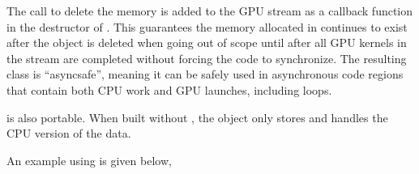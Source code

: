 \documentclass[letterpaper,10pt,english]{sphinxmanual}
\begin{document}
\sphinxAtStartPar
The call to delete the memory is added to the GPU stream as a callback
function in the destructor of . This guarantees the
memory allocated in  continues to exist after the
 object is deleted when going out of scope until
after all GPU kernels in the stream are completed without forcing the
code to synchronize. The resulting  class is
“async\sphinxhyphen{}safe”, meaning it can be safely used in asynchronous code
regions that contain both CPU work and GPU launches, including
 loops.

\sphinxAtStartPar
{} is also portable. When built without , the
object only stores and handles the CPU version of the data.

\sphinxAtStartPar
An example using  is given below,
\end{document}
